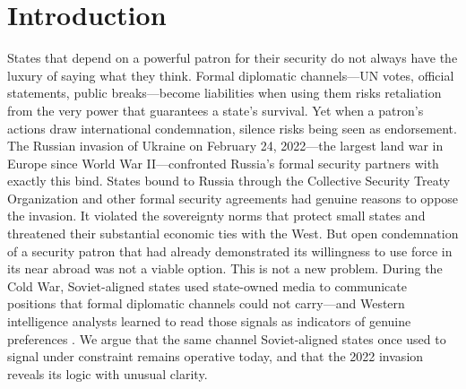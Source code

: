 \documentclass[12pt]{article}
\begin{document}


\section*{Introduction}

States that depend on a powerful patron for their security do not always have the luxury of saying what they think. Formal diplomatic channels---UN votes, official statements, public breaks---become liabilities when using them risks retaliation from the very power that guarantees a state's survival. Yet when a patron's actions draw international condemnation, silence risks being seen as endorsement. The Russian invasion of Ukraine on February 24, 2022---the largest land war in Europe since World War II---confronted Russia's formal security partners with exactly this bind. States bound to Russia through the Collective Security Treaty Organization and other formal security agreements had genuine reasons to oppose the invasion. It violated the sovereignty norms that protect small states and threatened their substantial economic ties with the West. But open condemnation of a security patron that had already demonstrated its willingness to use force in its near abroad was not a viable option. This is not a new problem. During the Cold War, Soviet-aligned states used state-owned media to communicate positions that formal diplomatic channels could not carry---and Western intelligence analysts learned to read those signals as indicators of genuine preferences \citep{cohen_theatre_1987}. We argue that the same channel Soviet-aligned states once used to signal under constraint remains operative today, and that the 2022 invasion reveals its logic with unusual clarity.
 
\end{document}
